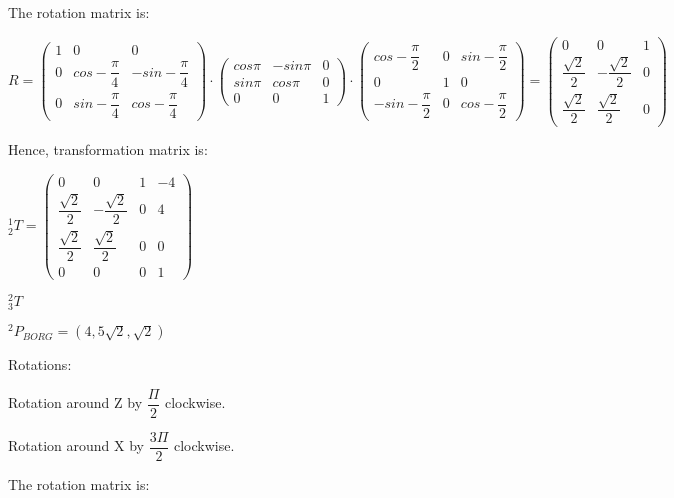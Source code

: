 \documentclass[12pt]{article}
\begin{document}
\begin{list}{)~}{}
The rotation matrix is:

$R=\left(\begin{array}{ccc}
1 & 0 & 0 \\
0 & cos -\dfrac{\pi}{4} & -sin -\dfrac{\pi}{4}  \\
0 & sin -\dfrac{\pi}{4}  & cos -\dfrac{\pi}{4}\end{array}\right)\cdot
\left(\begin{array}{ccc}
cos \pi & -sin \pi & 0 \\
sin \pi & cos \pi & 0\\
0 & 0 & 1\end{array}\right)\cdot
\left(\begin{array}{ccc}
cos -\dfrac{\pi}{2} & 0 & sin -\dfrac{\pi}{2} \\
0 & 1 & 0\\
-sin -\dfrac{\pi}{2} & 0 & cos -\dfrac{\pi}{2} 
\end{array}\right)=
\left(\begin{array}{ccc}
0 & 0 & 1 \\
\dfrac{\sqrt{2}}{2} & -\dfrac{\sqrt{2}}{2} & 0 \\
\dfrac{\sqrt{2}}{2} & \dfrac{\sqrt{2}}{2} & 0\end{array}\right)$
 
Hence, transformation matrix is:
 
$_{2}^1T = \left(\begin{array}{cccc}
0 & 0 & 1 & -4 \\
\dfrac{\sqrt{2}}{2} & -\dfrac{\sqrt{2}}{2} & 0 & 4 \\
\dfrac{\sqrt{2}}{2} & \dfrac{\sqrt{2}}{2} & 0 & 0\\
0 & 0 & 0 & 1\end{array}\right)$

\item
$_{3}^2T$

$^2 P_{BORG} = \left(4, 5\sqrt{2}, \sqrt{2}\right)$

Rotations:
\begin{list}{)~}{}
\item Rotation around Z by $\dfrac{\Pi}{2}$ clockwise.
\item Rotation around X by $\dfrac{3 \Pi}{2}$ clockwise.
\end{list}
 
The rotation matrix is:


\end{list}
\end{document}
